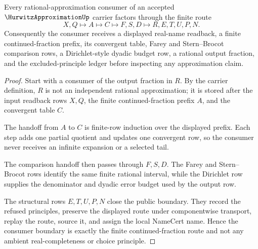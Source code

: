 \begin{theorem}
\label{thm:hurwitz-approximation-continued-fraction-handoff}
Every rational-approximation consumer of an accepted $\HurwitzApproximationUp$ carrier factors through the finite route
$$
X,Q \longmapsto A \longmapsto C \longmapsto F,S,D \longmapsto R,E,T,U,P,N .
$$
Consequently the consumer receives a displayed real-name readback, a finite continued-fraction prefix, its convergent table, Farey and Stern--Brocot comparison rows, a Dirichlet-style dyadic budget row, a rational output fraction, and the excluded-principle ledger before inspecting any approximation claim.
\end{theorem}
\begin{proof}
Start with a consumer of the output fraction in $R$. By the carrier definition, $R$ is not an independent rational approximation; it is stored after the input readback rows $X,Q$, the finite continued-fraction prefix $A$, and the convergent table $C$.

The handoff from $A$ to $C$ is finite-row induction over the displayed prefix. Each step adds one partial quotient and updates one convergent row, so the consumer never receives an infinite expansion or a selected tail.

The comparison handoff then passes through $F,S,D$. The Farey and Stern--Brocot rows identify the same finite rational interval, while the Dirichlet row supplies the denominator and dyadic error budget used by the output row.

The structural rows $E,T,U,P,N$ close the public boundary. They record the refused principles, preserve the displayed route under componentwise transport, replay the route, source it, and assign the local NameCert name. Hence the consumer boundary is exactly the finite continued-fraction route and not any ambient real-completeness or choice principle.
\end{proof}


